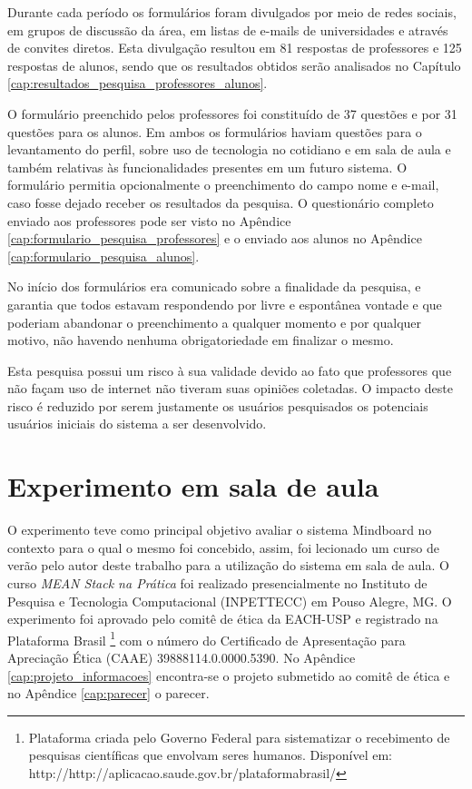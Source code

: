 Durante cada período os formulários foram divulgados por meio de redes sociais, em grupos de discussão da área, em listas de e-mails de universidades e através de convites diretos. Esta divulgação resultou em 81 respostas de professores e 125 respostas de alunos, sendo que os resultados obtidos serão analisados no Capítulo \ref{cap:resultados_pesquisa_professores_alunos}.

O formulário preenchido pelos professores foi constituído de 37 questões e por 31 questões para os alunos. Em ambos os formulários haviam questões para o levantamento do perfil, sobre uso de tecnologia no cotidiano e em sala de aula e também relativas às funcionalidades presentes em um futuro sistema. O formulário permitia opcionalmente o preenchimento do campo nome e e-mail, caso fosse dejado receber os resultados da pesquisa. O questionário completo enviado aos professores pode ser visto no Apêndice \ref{cap:formulario_pesquisa_professores} e o enviado aos alunos no Apêndice \ref{cap:formulario_pesquisa_alunos}.

No início dos formulários era comunicado sobre a finalidade da pesquisa, e  garantia que todos estavam respondendo por livre e espontânea vontade e que poderiam abandonar o preenchimento a qualquer momento e por qualquer motivo, não havendo nenhuma obrigatoriedade em finalizar o mesmo.

Esta pesquisa possui um risco à sua validade devido ao fato que professores que não façam uso de internet não tiveram suas opiniões coletadas. O impacto deste risco é reduzido por serem justamente os usuários pesquisados os potenciais usuários iniciais do sistema a ser desenvolvido.



\section{Experimento em sala de aula}
\label{sec:metodologia_experimento}

O experimento teve como principal objetivo avaliar o sistema Mindboard no contexto para o qual o mesmo foi concebido, assim, foi lecionado um curso de verão pelo autor deste trabalho para a utilização do sistema em sala de aula. O curso \emph{MEAN Stack na Prática} foi realizado presencialmente no Instituto de Pesquisa e Tecnologia Computacional (INPETTECC) em Pouso Alegre, MG. O experimento foi aprovado pelo comitê de ética da EACH-USP e registrado na Plataforma Brasil \footnote{Plataforma criada pelo Governo Federal para sistematizar o recebimento de pesquisas científicas que envolvam seres humanos. Disponível em: http://http://aplicacao.saude.gov.br/plataformabrasil/} com o número do Certificado de Apresentação para Apreciação Ética (CAAE) 39888114.0.0000.5390. No Apêndice \ref{cap:projeto_informacoes} encontra-se o projeto submetido ao comitê de ética e no Apêndice \ref{cap:parecer} o parecer.

